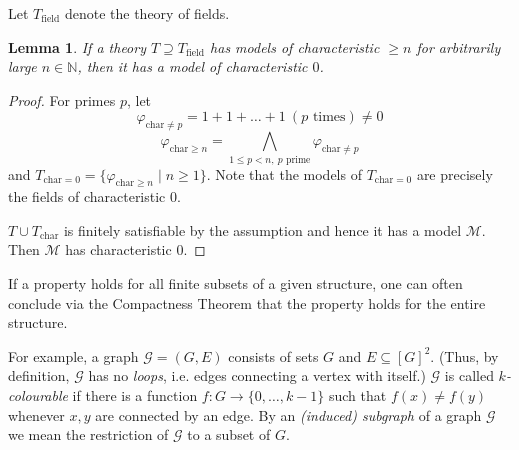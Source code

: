 \documentclass[a4paper, 11pt]{amsart}
\newtheorem{lemma}[lemma]{Lemma}
\theoremstyle{remark}
\newcommand{\NN}{\mathbb{N}}
\newcommand{\cG}{\mathcal G}
\newcommand{\cM}{\mathcal M}
\begin{document}
Let $T_{\text{field}}$ denote the theory of fields. 


\begin{lemma} 
\label{compactness and characteristic of fields} 
If a theory $T\supseteq T_{\text{field}}$ has models of characteristic $\geq n$ for arbitrarily large $n\in\NN$, then it has a model of characteristic $0$. 
\end{lemma} 
\begin{proof} 
For primes $p$, let 
$$ \varphi_{\mathrm{char} \neq p} =  1 + 1 + \dots + 1\ (p \text{ times}) \neq 0 $$ 
$$  \varphi_{\mathrm{char} \geq n} = \bigwedge_{1\leq p < n,\ p \text{ prime} } \varphi_{\mathrm{char} \neq p} $$ 
and $T_{\text{char}=0}= \{\varphi_{\mathrm{char} \geq n} \mid n\geq 1  \}  $. 
Note that the models of $T_{\text{char}=0}$ are precisely the fields of characteristic $0$. 

$T\cup T_{\text{char}}$ is finitely satisfiable by the assumption and hence it has a model $\cM$. 
Then $\cM$ has characteristic $0$. 
\end{proof} 


If a property holds for all finite subsets of a given structure, one can often conclude via the Compactness Theorem that the property holds for the entire structure. 

For example, a graph $\cG=(G,E)$ consists of sets $G$ and $E\subseteq [G]^2$. (Thus, by definition, $\cG$ has no \emph{loops}, i.e. edges connecting a vertex with itself.) 
$\cG$ is called \emph{$k$-colourable} if there is a function $f\colon G\rightarrow \{0,\dots,k-1\}$ such that $f(x)\neq f(y)$ whenever $x,y$ are connected by an edge. 
By an \emph{(induced) subgraph} of a graph $\cG$ we mean the restriction of $\cG$ to a subset of $G$. 
\end{document}
